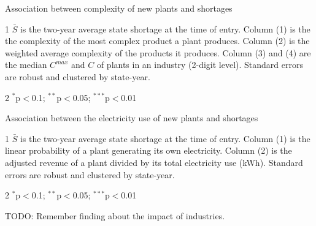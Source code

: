 \documentclass[11pt]{article}
\begin{document}
\begin{table} 
	\begin{center}
		\begin{threeparttable}
			\caption{Association between complexity of new plants and shortages}
			\label{tab:plant_entry_pci}
			
			\begin{tablenotes} \footnotesize
			\item[1] $\bar{S}$ is the two-year average state shortage at the time of entry. Column (1) is the the complexity of the most complex product a plant produces. Column (2) is the weighted average complexity of the products it produces. Column (3) and (4) are the median $C^{max}$ and $C$ of plants in an industry (2-digit level). Standard errors are robust and clustered by state-year.
		\item[2] $^{*}$p$<$0.1; $^{**}$p$<$0.05; $^{***}$p$<$0.01 \\
			\end{tablenotes}
		\end{threeparttable}
	\end{center}
\end{table}   



\begin{table} 
	\begin{center}
		\begin{threeparttable}
			\caption{Association between the electricity use of new plants and shortages}
			\label{tab:plant_entry_electricity}
			
			\begin{tablenotes} \footnotesize
			\item[1] $\bar{S}$ is the two-year average state shortage at the time of entry. Column (1) is the linear probability of a plant generating its own electricity. Column (2) is the adjusted revenue of a plant divided by its total electricity use (kWh). Standard errors are robust and clustered by state-year. 

       	\item[2] $^{*}$p$<$0.1; $^{**}$p$<$0.05; $^{***}$p$<$0.01 \\
			\end{tablenotes}
		\end{threeparttable}
	\end{center}
\end{table}   




TODO: Remember finding about the impact of industries.
\end{document}
